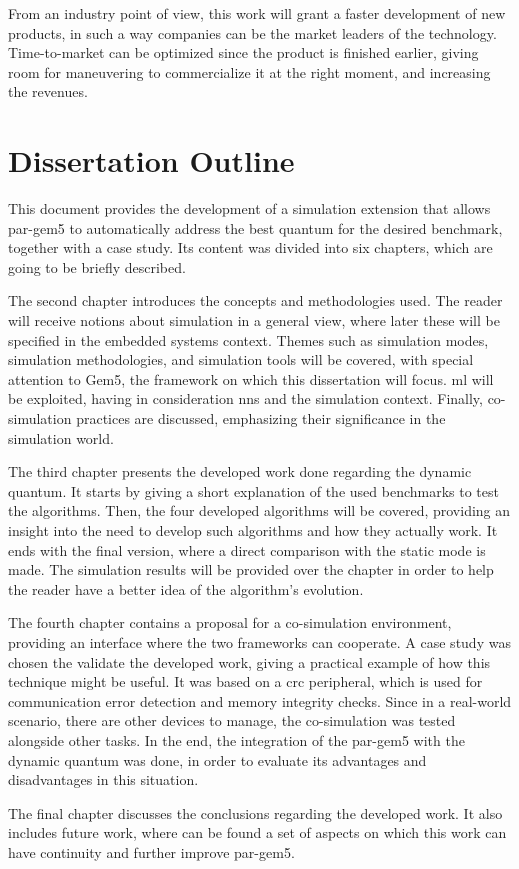  From an industry point of view, this work will grant a faster development of new products, in such a way companies can be the market leaders 
 of the technology. Time-to-market can be optimized since the product is finished earlier, giving room for maneuvering to commercialize it at the 
 right moment, and increasing the revenues.
 
\section{Dissertation Outline}

This document provides the development of a simulation extension that allows par-gem5 to automatically address the best quantum for the desired 
benchmark, together with a case study. Its content was divided into six chapters, which are going to be briefly described.

The second chapter introduces the concepts and methodologies used. The reader will receive notions about simulation in a general view, where 
later these will be specified in the embedded systems context. Themes such as simulation modes, simulation methodologies, and simulation tools 
will be covered, with special attention to Gem5, the framework on which this dissertation will focus. \gls{ml} will be exploited, having in 
consideration \glspl{nn} and the simulation context. Finally, co-simulation practices are discussed, emphasizing their significance in the 
simulation world.

The third chapter presents the developed work done regarding the dynamic quantum. It starts by giving a short explanation of the used benchmarks
to test the algorithms. Then, the four developed algorithms will be covered, providing an insight into the need to develop 
such algorithms and how they actually work. It ends with the final version, where a direct comparison with the static mode is made. The 
simulation results will be provided over the chapter in order to help the reader have a better idea of the algorithm's evolution.

The fourth chapter contains a proposal for a co-simulation environment, providing an interface where the two frameworks can cooperate. 
A case study was chosen the validate the developed work, giving a practical example of how this technique might be useful. 
It was based on a \gls{crc} peripheral, which is used for communication error detection and memory integrity checks. 
Since in a real-world scenario, there are other devices to manage, the co-simulation was tested alongside other tasks. In the end, the integration
of the par-gem5 with the dynamic quantum was done, in order to evaluate its advantages and disadvantages in this situation. 

The final chapter discusses the conclusions regarding the developed work. It also includes future work, where can be found a set of 
aspects on which this work can have continuity and further improve par-gem5. 

